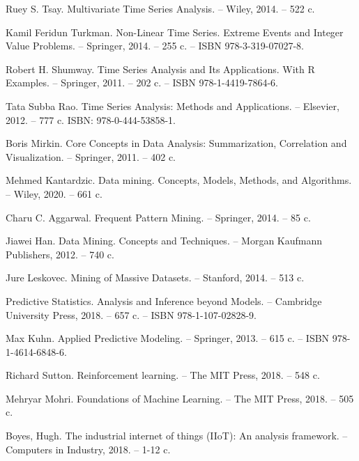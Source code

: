 \begin{thebibliography}{00}
    Ruey S. Tsay.
    Multivariate Time Series Analysis.
    -- Wiley, 2014. -- 522 c.

    Kamil Feridun Turkman.
    Non-Linear Time Series.
    Extreme Events and Integer Value Problems.
    -- Springer, 2014. -- 255 c.
    -- ISBN 978-3-319-07027-8.

    Robert H. Shumway.
    Time Series Analysis and Its Applications.
    With R Examples.
    -- Springer, 2011. -- 202 c.
    -- ISBN 978-1-4419-7864-6.

    Tata Subba Rao.
    Time Series Analysis: Methods and Applications.
    -- Elsevier, 2012. -- 777 c.
    ISBN: 978-0-444-53858-1.

    Boris Mirkin.
    Core Concepts in Data
    Analysis: Summarization, Correlation and Visualization.
    -- Springer, 2011. -- 402 c.

    Mehmed Kantardzic.
    Data mining.
    Concepts, Models, Methods, and Algorithms.
    -- Wiley, 2020. -- 661 c.

    Charu C. Aggarwal.
    Frequent Pattern Mining.
    -- Springer, 2014. -- 85 c.

    Jiawei Han.
    Data Mining.
    Concepts and Techniques.
    -- Morgan Kaufmann Publishers, 2012. -- 740 c.

    Jure Leskovec.
    Mining of Massive Datasets.
    -- Stanford, 2014. -- 513 c.

    Predictive Statistics.
    Analysis and Inference beyond Models.
    -- Cambridge University Press, 2018. -- 657 c.
    -- ISBN 978-1-107-02828-9.

    Max Kuhn.
    Applied Predictive Modeling.
    -- Springer, 2013. -- 615 c.
    -- ISBN 978-1-4614-6848-6.

    Richard Sutton.
    Reinforcement learning.
    -- The MIT Press, 2018. -- 548 c.

    Mehryar Mohri.
    Foundations of Machine Learning.
    -- The MIT Press, 2018. -- 505 c.

    Boyes, Hugh.
    The industrial internet of things (IIoT): An analysis framework.
    -- Computers in Industry, 2018. -- 1-12 c.


\end{thebibliography}
